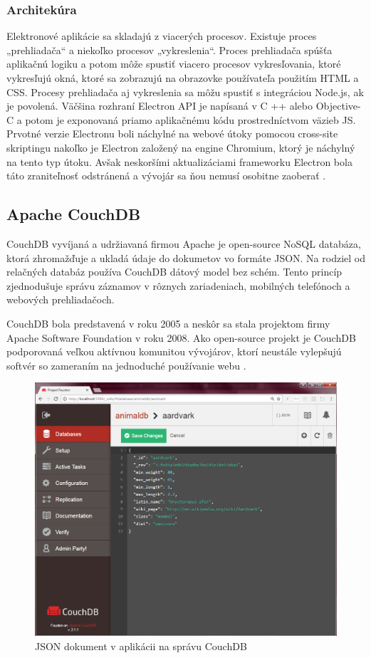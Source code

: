 \subsubsection{Architekúra}
\indent Elektronové aplikácie sa skladajú z viacerých procesov. Existuje proces „prehliadača“ a niekoľko procesov „vykreslenia“. Proces prehliadača spúšťa aplikačnú logiku a potom môže spustiť viacero procesov vykresľovania, ktoré vykresľujú okná, ktoré sa zobrazujú na obrazovke používateľa použitím HTML a CSS. Procesy prehliadača aj vykreslenia sa môžu spustiť s integráciou Node.js, ak je povolená.
\indent Väčšina rozhraní Electron API je napísaná v C ++ alebo Objective-C a potom je exponovaná priamo aplikačnému kódu prostredníctvom väzieb JS. Prvotné verzie Electronu boli náchylné na webové útoky pomocou cross-site skriptingu nakoľko je Electron založený na engine Chromium, ktorý je náchylný na tento typ útoku. Avšak neskoršími aktualizáciami frameworku Electron bola táto zraniteľnosť odstránená a vývojár sa ňou nemusí osobitne zaoberať \cite{electron}. 


\subsection{Apache CouchDB}
\indent CouchDB vyvíjaná a udržiavaná firmou Apache je open-source NoSQL databáza, ktorá zhromažďuje a ukladá údaje do dokumetov vo formáte JSON. Na rodziel od relačných databáz používa CouchDB dátový model bez schém. Tento princíp zjednodušuje správu záznamov v rôznych zariadeniach, mobilných telefónoch a webových prehliadačoch.

\indent CouchDB bola predstavená v roku 2005 a neskôr sa stala projektom firmy Apache Software Foundation v roku 2008. Ako open-source projekt je CouchDB podporovaná veľkou aktívnou komunitou vývojárov, ktorí neustále vylepšujú softvér so zameraním na jednoduché používanie webu \cite{coucdb}.

\begin{figure}[H]
    \centering
    \includegraphics[scale=0.25]{img/coucdb.png}
    \caption{JSON dokument v aplikácii na správu CouchDB \cite{coucdb}}
    \label{fig:couch_db}
\end{figure}

